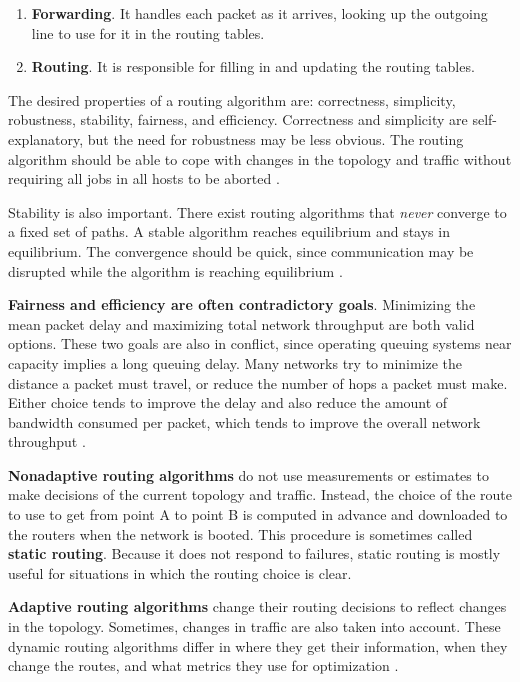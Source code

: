 \documentclass[12pt, oneside]{book}
\begin{document}
\begin{enumerate}
    \item \textbf{Forwarding}.
    It handles each packet as it arrives, looking up the outgoing line to use for it in the routing tables.
    \item \textbf{Routing}.
    It is responsible for filling in and updating the routing tables.
\end{enumerate}

The desired properties of a routing algorithm are: correctness, simplicity, robustness, stability, fairness, and efficiency.
Correctness and simplicity are self-explanatory, but the need for robustness may be less obvious.
The routing algorithm should be able to cope with changes in the topology and traffic without requiring all jobs in all hosts to be aborted \cite[p.~363]{computer-networks-tanenbaum-2012}.

Stability is also important. There exist routing algorithms that \textit{never} converge to a fixed set of paths.
A stable algorithm reaches equilibrium and stays in equilibrium.
The convergence should be quick, since communication may be disrupted while the algorithm is reaching equilibrium \cite[p.~363]{computer-networks-tanenbaum-2012}.

\textbf{Fairness and efficiency are often contradictory goals}.
Minimizing the mean packet delay and maximizing total network throughput are both valid options.
These two goals are also in conflict, since operating queuing systems near capacity implies a long queuing delay.
Many networks try to minimize the distance a packet must travel, or reduce the number of hops a packet must make.
Either choice tends to improve the delay and also reduce the amount of bandwidth consumed per packet, which tends to improve the overall network throughput \cite[p.~363]{computer-networks-tanenbaum-2012}.

\textbf{Nonadaptive routing algorithms} do not use measurements or estimates to make decisions of the current topology and traffic.
Instead, the choice of the route to use to get from point A to point B is computed in advance and downloaded to the routers when the network is booted.
This procedure is sometimes called \textbf{static routing}.
Because it does not respond to failures, static routing is mostly useful for situations in which the routing choice is clear.

\textbf{Adaptive routing algorithms} change their routing decisions to reflect changes in the topology.
Sometimes, changes in traffic are also taken into account.
These dynamic routing algorithms differ in where they get their information, when they change the routes, and what metrics they use for optimization \cite[p.~364]{computer-networks-tanenbaum-2012}.
\end{document}
